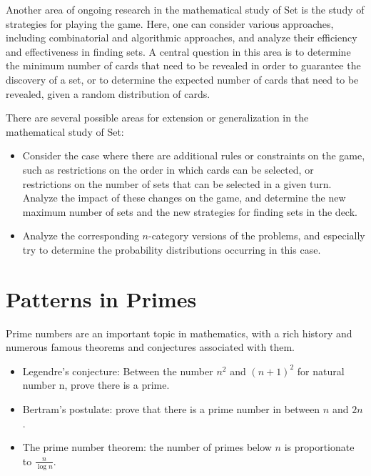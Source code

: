 \documentclass{article}
\begin{document}
    \vspace{3mm}
    Another area of ongoing research in the mathematical study of Set is the study of strategies for playing the game. Here, one can consider various approaches, including combinatorial and algorithmic approaches, and analyze their efficiency and effectiveness in finding sets. A central question in this area is to determine the minimum number of cards that need to be revealed in order to guarantee the discovery of a set, or to determine the expected number of cards that need to be revealed, given a random distribution of cards.
    
    \vspace{3mm}
    \noindent There are several possible areas for extension or generalization in the mathematical study of Set:
    \begin{itemize}
        \item Consider the case where there are additional rules or constraints on the game, such as restrictions on the order in which cards can be selected, or restrictions on the number of sets that can be selected in a given turn. Analyze the impact of these changes on the game, and determine the new maximum number of sets and the new strategies for finding sets in the deck.
        \item Analyze the corresponding $n$-category versions of the problems, and especially try to determine the probability distributions occurring in this case.
    \end{itemize}

\pagebreak

\section{Patterns in Primes}
    Prime numbers are an important topic in mathematics, with a rich history and numerous famous theorems and conjectures associated with them.
    \begin{itemize}
        \item Legendre's conjecture: Between the number $n^2$ and $(n + 1)^2$ for natural number n, prove there is a prime.
        \item Bertram's postulate: prove that there is a prime number in between $n$ and $2n$.
        \item The prime number theorem: the number of primes below $n$ is proportionate to $\frac{n}{\log n}$.
    \end{itemize}
\end{document}
